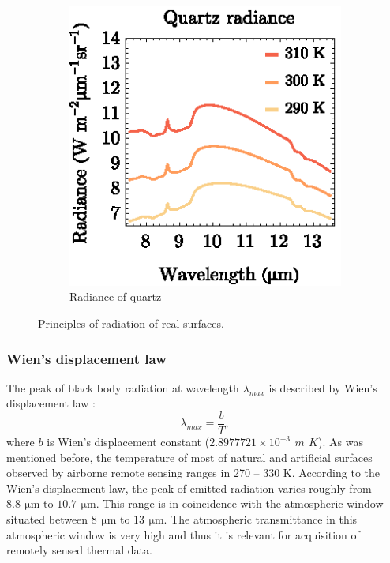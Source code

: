 \begin{figure}[htb]
\begin{subfigure}[t]{.3\linewidth}
	\end{subfigure}
	\hspace{1em}
	\begin{subfigure}[t]{.3\linewidth}
		\centering
		\includegraphics[scale=1]{pics/Chapter_01/QuartzRadiance.eps}
		\vspace{-0.1cm}
		\caption{Radiance of quartz}
		\label{fig:QuartzRadiance}
	\end{subfigure}
	\vspace{1.5 em}
	\caption{Principles of radiation of real surfaces.}
\end{figure}


\subsubsection*{Wien's displacement law}
The peak of black body radiation at wavelength $\lambda_{max}$ is described by Wien's displacement law \cite{H11}:
$$ \lambda_{max} = \frac{b}{T},$$
where $b$ is Wien's displacement constant ($2.8977721\times 10^{-3}\,\SI{}{m}\,\SI{}{K}$). As was mentioned before, the temperature of most of natural and artificial surfaces observed by airborne remote sensing ranges in 270 – 330 K. According to the Wien's displacement law, the peak of emitted radiation varies roughly from $8.8\,\SI{}{\micro\meter}$ to $10.7\,\SI{}{\micro\meter}$. This range is in coincidence with the atmospheric window situated between $8\,\SI{}{\micro\meter}$ to $13\,\SI{}{\micro\meter}$. The atmospheric transmittance in this atmospheric window is very high and thus it is relevant for acquisition of remotely sensed thermal data.

